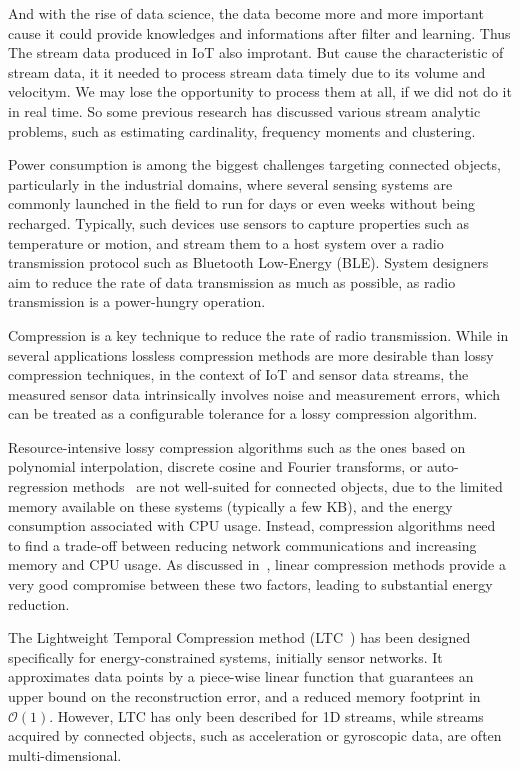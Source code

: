 \documentclass{report}
\begin{document}
And with the rise of data science, the data become more and more important cause it could provide knowledges and informations after filter and learning.
Thus The stream data produced in IoT also improtant. But cause the characteristic of stream data, it it needed to process stream data timely due to its volume and velocitym. We may lose the opportunity to process them at all, if we did not do it in real time. So some previous research has discussed various stream analytic problems, such as estimating cardinality, frequency moments and clustering.

Power consumption is among the biggest challenges targeting connected 
objects, particularly in the industrial domains, where several sensing 
systems are commonly launched in the field to run for days or even 
weeks without being recharged. Typically, such devices use sensors to 
capture properties such as temperature or motion, and stream them to a 
host system over a radio transmission protocol such as Bluetooth 
Low-Energy (BLE). System designers aim to reduce the rate of data 
transmission as much as possible, as radio transmission is a 
power-hungry operation.

Compression is a key technique to reduce the rate of radio 
transmission.  While in several applications lossless compression 
methods are more desirable than lossy compression techniques, in the 
context of IoT and sensor data streams, the measured sensor data 
intrinsically involves noise and measurement errors, which can 
be treated as a configurable tolerance for a lossy compression algorithm. 

Resource-intensive lossy compression algorithms such as the ones based on 
polynomial interpolation, discrete cosine and Fourier transforms, or 
auto-regression methods~\cite{lu2010optimized} are not well-suited for 
connected objects, due to the limited memory available on 
these systems (typically a few KB), and the energy consumption 
associated with CPU usage. Instead, compression algorithms need 
to find a trade-off between reducing network communications and 
increasing memory and CPU usage. As 
discussed in~\cite{zordan2014performance}, linear compression methods 
provide a very good compromise between these two factors, leading to 
substantial energy reduction.


The Lightweight Temporal Compression method 
(LTC~\cite{schoellhammer2004lightweight}) has been designed 
specifically for energy-constrained systems, initially sensor networks. 
It approximates data points by a piece-wise linear function that 
guarantees an upper bound on the reconstruction error, and a reduced 
memory footprint in $\mathcal{O}(1)$. However, LTC has only been 
described for 1D streams, while streams acquired by connected objects, such as 
acceleration or gyroscopic data, are often multi-dimensional. 
\end{document}
